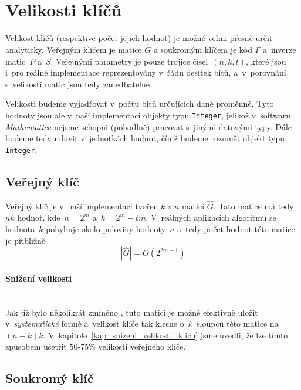 \documentclass[thesis=M,czech,hidelinks]{FITthesis}[2012/06/26]
\newcommand{\0}{{\textcolor[gray]{0.75}{0}}}
\begin{document}
\section{Velikosti klíčů}\label{kap_mereni_velikost}

Velikost klíčů (respektive počet jejich hodnot) je možné velmi přesně určit
analyticky. Veřejným klíčem je matice $\hat{G}$ a soukromým klíčem je kód
$\Gamma$ a~inverze matic~$P$ a~$S$. Veřejnými parametry je pouze trojice
čísel~$(n,k,t)$, které jsou i~pro reálné implementace reprezentovány v~řádu
desítek bitů, a~v~porovnání s~velikostí matic jsou tedy zanedbatelné.

Velikosti budeme vyjadřovat v~počtu bitů určujících dané proměnné. Tyto hodnoty
jsou ale v~naší implementaci objekty typu \texttt{Integer}, jelikož v~softwaru
\emph{Mathematica} nejsme schopni (pohodlně) pracovat s~jinými datovými typy.
Dále budeme tedy mluvit v~jednotkách hodnot, čímž budeme rozumět objekt typu
\texttt{Integer}.


\subsection{Veřejný klíč}

Veřejný klíč je v~naší implementaci tvořen $k \times n$ maticí $\hat{G}$. Tato
matice má tedy $nk$ hodnot, kde~$n=2^m$ a~$k=2^m-tm$. V~reálných aplikacích
algoritmu se hodnota~$k$ pohybuje okolo poloviny hodnoty~$n$ a~tedy počet hodnot
této matice je přibližně
$$ \left|\hat{G}\right| = O\left( 2^{2m-1} \right) $$

\vfil

\paragraph{Snížení velikosti} \hfil \\
Jak již bylo několikrát zmíněno , tuto matici je možné efektivně
uložit v~\emph{systematické} formě a~velikost klíče tak klesne o~$k$~sloupců
této matice na $(n-k) k$. V~kapitole~\ref{kap_snizeni_velikosti_klicu} jsme
uvedli, že lze tímto způsobem ušetřit $50$-$75$\;\% velikosti veřejného klíče.

\subsection{Soukromý klíč}
\end{document}
